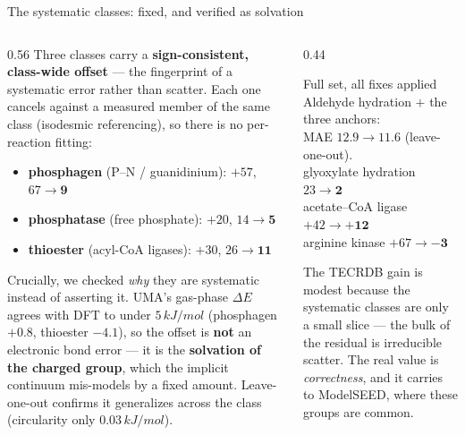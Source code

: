 \documentclass[aspectratio=169,11pt]{beamer}
\newcommand{\kj}{\,kJ/mol}
\begin{document}
\begin{frame}{The systematic classes: fixed, and verified as solvation}
  \begin{columns}[T]
    \begin{column}{0.56\textwidth}\footnotesize
      Three classes carry a \textbf{sign-consistent, class-wide offset} --- the fingerprint of a
      systematic error rather than scatter. Each one cancels against a measured member of the same
      class (isodesmic referencing), so there is no per-reaction fitting:
      \begin{itemize}
        \item \textbf{phosphagen} (P--N / guanidinium): $+57$, \; $67 \to \mathbf{9}$
        \item \textbf{phosphatase} (free phosphate): $+20$, \; $14 \to \mathbf{5}$
        \item \textbf{thioester} (acyl-CoA ligases): $+30$, \; $26 \to \mathbf{11}$
      \end{itemize}
      \vspace{0.3em}
      Crucially, we checked \emph{why} they are systematic instead of asserting it. UMA's gas-phase
      $\Delta E$ agrees with DFT to under $5\kj$ (phosphagen $+0.8$, thioester $-4.1$), so the offset is
      \textbf{not} an electronic bond error --- it is the \textbf{solvation of the charged group}, which
      the implicit continuum mis-models by a fixed amount. Leave-one-out confirms it generalizes across
      the class (circularity only $0.03\kj$).
    \end{column}
    \begin{column}{0.44\textwidth}
      \begin{block}{Full set, all fixes applied}
        \footnotesize
        Aldehyde hydration $+$ the three anchors:\\[0.3em]
        MAE \textbf{$12.9 \to 11.6$} (leave-one-out).\\[0.4em]
        glyoxylate hydration $23\to\mathbf{2}$\\
        acetate--CoA ligase $+42\to\mathbf{+12}$\\
        arginine kinase $+67\to\mathbf{-3}$
      \end{block}
      {\scriptsize The TECRDB gain is modest because the systematic classes are only a small slice ---
      the bulk of the residual is irreducible scatter. The real value is \emph{correctness}, and it
      carries to ModelSEED, where these groups are common.}
    \end{column}
  \end{columns}
\end{frame}
\end{document}
